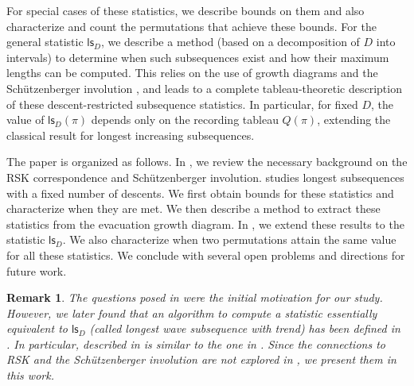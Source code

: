 \documentclass[12pt]{article}
\newcommand{\ls}{\mathsf{ls}}
\newtheorem{remark}[theorem]{Remark}
\theoremstyle{definition}
\begin{document}
For special cases of these statistics, we describe bounds on them and also characterize and count the permutations that achieve these bounds. 
For the general statistic $\ls_D$, we describe a method (based on a decomposition of $D$ into intervals) to determine when such subsequences exist and how their maximum lengths can be computed. 
This relies on the use of growth diagrams and the Sch\"utzenberger involution \cite{fomin_growth,schutzenberger}, and leads to a complete tableau-theoretic description of these descent-restricted subsequence statistics. 
In particular, for fixed $D$, the value of $\ls_D(\pi)$ depends only on the recording tableau $Q(\pi)$, extending the classical result for longest increasing subsequences.

The paper is organized as follows. 
In , we review the necessary background on the RSK correspondence and Sch\"utzenberger involution. 
 studies longest subsequences with a fixed number of descents. 
We first obtain bounds for these statistics and  characterize when they are met. 
We then describe a method to extract these statistics from the evacuation growth diagram. 
In , we extend these results to the statistic $\ls_D$. 
We also characterize when two permutations attain the same value for all these statistics. 
We conclude with several open problems and directions for future work.

\begin{remark}
    The questions posed in \cite[Section 5]{stan_as} were the initial motivation for our study. 
    However, we later found that an algorithm to compute a statistic essentially equivalent to $\ls_D$ (called \emph{longest wave subsequence with trend}) has been defined in \cite{wave}. 
    In particular,  described in  is similar to the one in \cite{wave}. 
    Since the connections to RSK and the Sch\"utzenberger involution are not explored in \cite{wave}, we present them in this work.
\end{remark}




\end{document}
